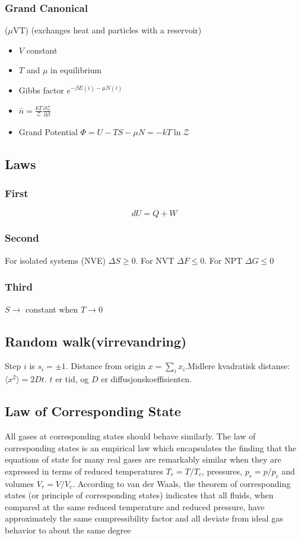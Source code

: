 \documentclass[a4paper,norsk, 10pt]{article}
\begin{document}
\subsubsection{Grand Canonical}
($\mu$VT) (exchanges heat and particles with a reservoir)
\begin{itemize}
\item $V$ constant
\item $T$ and $\mu$ in equilibrium
\item Gibbs factor $e^{-\beta E(i)-\mu N(i)}$
\item $\bar{n} = \frac{kT}{\mathcal{Z}}\frac{\partial \mathcal{Z}}{\partial \beta}$
\item Grand Potential $\Phi = U - TS - \mu N = -kT\ln \mathcal{Z}$
\end{itemize}
\subsection{Laws}
\subsubsection{First}
\begin{equation}
dU = Q + W
\end{equation}
\subsubsection{Second}
For isolated systems (NVE) $\Delta S \geq 0$. For NVT $\Delta F \leq 0$. For NPT $\Delta G \leq 0$
\subsubsection{Third}
$S\rightarrow $ constant when $T\rightarrow 0$
\subsection{Random walk(virrevandring)}
Step $i$ is $s_i = \pm 1$. Distance from origin $x = \sum_i x_i$.Midlere kvadratisk distanse: $\langle x^2 \rangle = 2Dt$. $t$ er tid, og $D$ er diffusjonskoeffisienten.
\subsection{Law of Corresponding State}
All gases at corresponding states should behave similarly. The law of corresponding states is an empirical law which encapsulates the finding that the equations of state for many real gases are remarkably similar when they are expressed in terms of reduced temperatures $T_r = T/T_c$, pressures, $p_r = p/p_c$ and volumes $V_r = V/V_c$. According to van der Waals, the theorem of corresponding states (or principle of corresponding states) indicates that all fluids, when compared at the same reduced temperature and reduced pressure, have approximately the same compressibility factor and all deviate from ideal gas behavior to about the same degree
\end{document}
